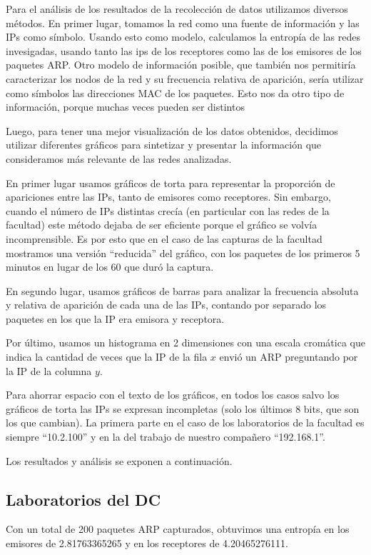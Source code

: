 Para el análisis de los resultados de la recolección de datos utilizamos
diversos métodos. En primer lugar, tomamos la red como una fuente de
información y las IPs como símbolo. Usando esto como modelo, calculamos la
entropía de las redes invesigadas, usando tanto las ips de los receptores como
las de los emisores de los paquetes ARP. Otro modelo de información posible,
que también nos permitiría caracterizar los nodos de la red y su frecuencia
relativa de aparición, sería utilizar como símbolos las direcciones MAC de los
paquetes. Esto nos da otro tipo de información, porque muchas veces pueden ser
distintos 

Luego, para tener una mejor visualización de los datos obtenidos, decidimos
utilizar diferentes gráficos para sintetizar y presentar la información que
consideramos más relevante de las redes analizadas.

En primer lugar usamos gráficos de torta para representar la proporción de
apariciones entre las IPs, tanto de emisores como receptores. Sin embargo,
cuando el número de IPs distintas crecía (en particular con las redes de la
facultad) este método dejaba de ser eficiente porque el gráfico se volvía
incomprensible. Es por esto que en el caso de las capturas de la facultad
mostramos una versión ``reducida'' del gráfico, con los paquetes de los
primeros 5 minutos en lugar de los 60 que duró la captura.

En segundo lugar, usamos gráficos de barras para analizar la frecuencia
absoluta y relativa de aparición de cada una de las IPs, contando por separado
los paquetes en los que la IP era emisora y receptora.

Por último, usamos un histograma en 2 dimensiones con una escala cromática
que indica la cantidad de veces que la IP de la fila $x$ envió un ARP
preguntando por la IP de la columna $y$.

Para ahorrar espacio con el texto de los gráficos, en todos los casos salvo los
gráficos de torta las IPs se expresan incompletas (solo los últimos 8 bits, que
son los que cambian). La primera parte en el caso de los laboratorios de la
facultad es siempre ``10.2.100'' y en la del trabajo de nuestro compañero
``192.168.1''.

Los resultados y análisis se exponen a continuación.

\subsection{Laboratorios del DC}
Con un total de 200 paquetes ARP capturados, obtuvimos una entropía en los
emisores de 2.81763365265 y en los receptores de 4.20465276111.

